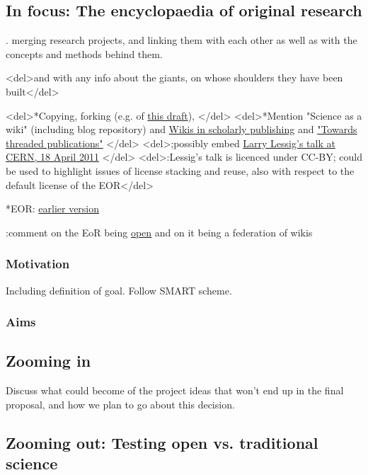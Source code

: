 \documentclass[final,authoryear,3p]{elsarticle-open-drafting}
\begin{document}
\subsection{In focus: The encyclopaedia of original research}

. merging research projects, and linking them with each other as well as with the concepts and methods behind them.

<del>and with any info about the giants, on whose shoulders they have been built</del>

<del>*Copying, forking (e.g. of \href{http://species-id.net/w/index.php?title=Draft:Encyclopaedia_of_original_research&diff=prev&oldid=5076}{this draft}), </del>
<del>*Mention "Science as a wiki" (including blog repository) and \href{http://species-id.net/wiki/Wikis_in_scholarly_publishing}{Wikis in scholarly publishing} and \href{http://friendfeed.com/cameronneylon/c476db70/imo-this-is-possibly-single-most-useful-thing-we}{"Towards threaded publications"} </del>
<del>;possibly embed \href{http://vimeo.com/22633948}{Larry Lessig's talk at CERN, 18 April 2011} </del>
<del>:Lessig's talk is licenced under CC-BY; could be used to highlight issues of license stacking and reuse, also with respect to the default license of the EOR</del>

*EOR: \href{http://www.science3point0.com/coaspedia/index.php/Proposals:Wikimedia_Deutschland/2010/Wissenswert/Wissenschaft_als_Wiki/English}{earlier version}


:comment on the EoR being \href{http://www.opendefinition.org/}{open} and on it being a federation of wikis

\subsubsection{Motivation}
Including definition of goal. Follow SMART scheme.

\subsubsection{Aims}

\subsection{Zooming in}
Discuss what could become of the project ideas that won't end up in the final proposal, and how we plan to go about this decision.

\subsection{Zooming out: Testing open vs. traditional science}
\end{document}
